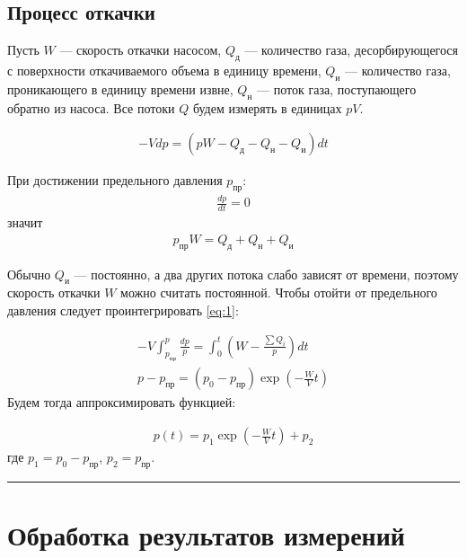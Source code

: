 \documentclass[a4paper,12pt]{report}
\begin{document}
    \newpage

    \subsection{Процесс откачки}

    \begin{multicols}{2}
        Пусть $W$ --- скорость откачки насосом, $Q_\text{д}$ --- количество газа, десорбирующегося с поверхности откачиваемого объема в единицу времени, $Q_\text{и}$ --- количество газа, проникающего в единицу времени извне, $Q_\text{н}$ --- поток газа, поступающего обратно из насоса. Все потоки $Q$ будем измерять в единицах $pV$.

        \begin{gather}
            -Vdp=(pW-Q_\text{д}-Q_\text{н}-Q_\text{и})dt \label{eq:1}
        \end{gather}

        При достижении предельного давления $p_\text{пр}$:
        \begin{gather*}
            \frac{dp}{dt}=0
        \end{gather*}
        значит
        \begin{gather}
            p_\text{пр}W=Q_\text{д}+Q_\text{н}+Q_\text{и}
            \label{lim}
        \end{gather}

        Обычно $Q_\text{и}$ --- постоянно, а два других потока слабо зависят от времени, поэтому скорость откачки $W$ можно считать постоянной. Чтобы отойти от предельного давления следует проинтегрировать \eqref{eq:1}:

        \begin{gather*}
            -V\int_{p_\text{пр}}^{p}\frac{dp}{p}=\int_{0}^{t}\left(W-\frac{\sum Q_i}{p}\right)dt \\
            p-p_\text{пр}=(p_0-p_\text{пр})\exp{\left(-\frac{W}{V}t\right)}
        \end{gather*}
        Будем тогда аппроксимировать функцией:

        \begin{gather}
            p(t)=p_1 \exp\left(-\frac{W}{V}t\right)+p_2
        \end{gather}
        где $p_1=p_0-p_\text{пр}$, $p_2=p_\text{пр}$.

    \end{multicols}

    \hrule

    \section{Обработка результатов измерений}
\end{document}
